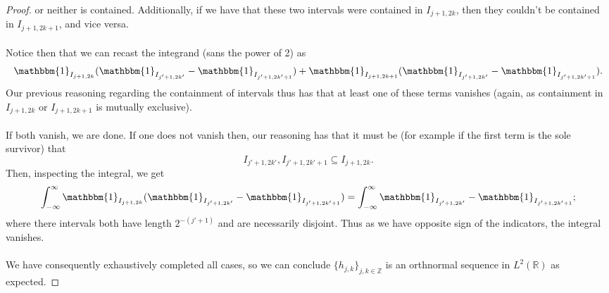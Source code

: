 \documentclass[12pt]{article}
\newenvironment{ex}[2][Exercise]{\begin{trivlist}
\item[\hskip \labelsep {\bfseries #1}\hskip \labelsep {\bfseries #2.}]}{\end{trivlist}}
\begin{document}
\begin{ex}{14}
\begin{enumerate}[label=14.\arabic*]
\begin{proof}
            or neither is contained. Additionally, if we have that these two intervals were contained in $I_{j + 1, 2k}$, then they couldn't be contained in $I_{j + 1, 2k+1}$, and vice versa. \\ \\
            Notice then that we can recast the integrand (sans the power of 2) as 
            $$\mathbbm{1}_{I_{j + 1, 2k}} (\mathbbm{1}_{I_{j' + 1, 2k'}} - \mathbbm{1}_{I_{j' + 1, 2k' + 1}}) + \mathbbm{1}_{I_{j + 1, 2k + 1}}(\mathbbm{1}_{I_{j' + 1, 2k'}} - \mathbbm{1}_{I_{j' + 1, 2k' + 1}}).$$
            Our previous reasoning regarding the containment of intervals thus has that at least one of these terms vanishes (again, as containment in $I_{j + 1, 2k}$ or $I_{j + 1, 2k + 1}$ is mutually exclusive). \\ \\
            If both vanish, we are done. If one does not vanish then, our reasoning has that it must be (for example if the first term is the sole survivor) that 
            $$I_{j' + 1, 2k'}, I_{j' + 1, 2k' + 1} \subseteq I_{j + 1, 2k}.$$
            Then, inspecting the integral, we get 
            $$\int_{-\infty}^\infty \mathbbm{1}_{I_{j + 1, 2k}} (\mathbbm{1}_{I_{j' + 1, 2k'}} - \mathbbm{1}_{I_{j' + 1, 2k' + 1}}) = \int_{-\infty}^\infty \mathbbm{1}_{I_{j' + 1, 2k'}} - \mathbbm{1}_{I_{j' + 1, 2k' + 1}};$$
            where there intervals both have length $2^{-(j' + 1)}$ and are necessarily disjoint. Thus as we have opposite sign of the indicators, the integral vanishes. \\ \\
            We have consequently exhaustively completed all cases, so we can conclude $\{h_{j,k}\}_{j, k \in \mathbb{Z}}$ is an orthnormal sequence in $L^2(\mathbb{R})$ as expected.





\end{proof}
\end{enumerate}
\end{ex}
\end{document}
